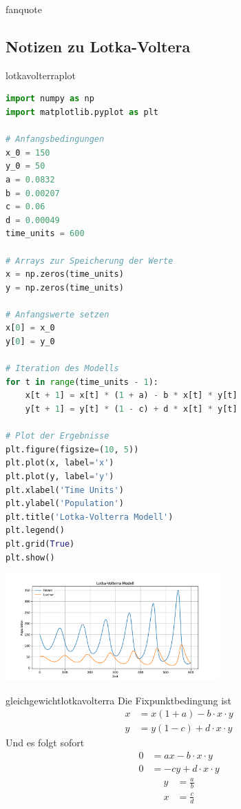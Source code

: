 \documentclass[%
<<<<<<< Updated upstream
<<<<<<< Updated upstream
11pt,%
twoside,%
titlepage,%
german,%
headsepline%
]{scrartcl}
\begin{document}
\begin{uebenv}{fanquote}
\clearpage

\subsection{Notizen zu Lotka-Voltera}

\begin{lsg}{lotkavolterraplot}
    \begin{lstlisting}[language=python]
import numpy as np
import matplotlib.pyplot as plt

# Anfangsbedingungen
x_0 = 150
y_0 = 50
a = 0.0832
b = 0.00207
c = 0.06
d = 0.00049
time_units = 600

# Arrays zur Speicherung der Werte
x = np.zeros(time_units)
y = np.zeros(time_units)

# Anfangswerte setzen
x[0] = x_0
y[0] = y_0

# Iteration des Modells
for t in range(time_units - 1):
    x[t + 1] = x[t] * (1 + a) - b * x[t] * y[t]
    y[t + 1] = y[t] * (1 - c) + d * x[t] * y[t]

# Plot der Ergebnisse
plt.figure(figsize=(10, 5))
plt.plot(x, label='x')
plt.plot(y, label='y')
plt.xlabel('Time Units')
plt.ylabel('Population')
plt.title('Lotka-Volterra Modell')
plt.legend()
plt.grid(True)
plt.show()
\end{lstlisting}

\begin{center}
\includegraphics[width=0.618\textwidth]{pictures/hasenluchsepdf.pdf}
\end{center}

\end{lsg}

\begin{lsg}{gleichgewichtlotkavolterra}
Die Fixpunktbedingung ist
\begin{align*}
x &= x(1+a)-b\cdot x\cdot y\\
y &= y(1-c)+d\cdot x\cdot y
\end{align*}
Und es folgt sofort
\begin{align*}
0 &= ax-b\cdot x\cdot y\\
0 &= -cy+d\cdot x\cdot y
\end{align*}
\begin{align*}
y &= \frac{a}{b}\\
x &= \frac{c}{d}
\end{align*}
\end{lsg}


\end{uebenv}
\end{document}
